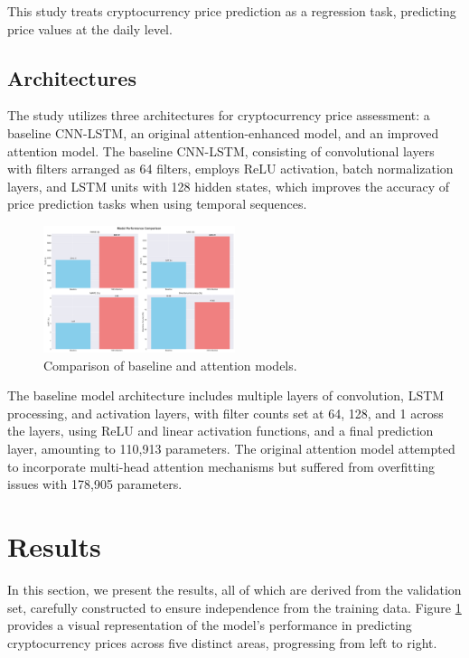 \documentclass[conference]{IEEEtran}
\begin{document}
This study treats cryptocurrency price prediction as a regression task, predicting price values at the daily level.

\subsection{Architectures}

The study utilizes three architectures for cryptocurrency price assessment: a baseline CNN-LSTM, an original attention-enhanced model, and an improved attention model. The baseline CNN-LSTM, consisting of convolutional layers with filters arranged as 64 filters, employs ReLU activation, batch normalization layers, and LSTM units with 128 hidden states, which improves the accuracy of price prediction tasks when using temporal sequences.

\begin{figure}[htbp]
\centerline{\includegraphics[width=0.5\textwidth]{figures/model_comparison.png}}
\caption{Comparison of baseline and attention models.}
\label{fig:model_comparison}
\end{figure}

The baseline model architecture includes multiple layers of convolution, LSTM processing, and activation layers, with filter counts set at 64, 128, and 1 across the layers, using ReLU and linear activation functions, and a final prediction layer, amounting to 110,913 parameters. The original attention model attempted to incorporate multi-head attention mechanisms but suffered from overfitting issues with 178,905 parameters.

\section{Results}

In this section, we present the results, all of which are derived from the validation set, carefully constructed to ensure independence from the training data. Figure \ref{fig:model_comparison} provides a visual representation of the model's performance in predicting cryptocurrency prices across five distinct areas, progressing from left to right.
\end{document}

